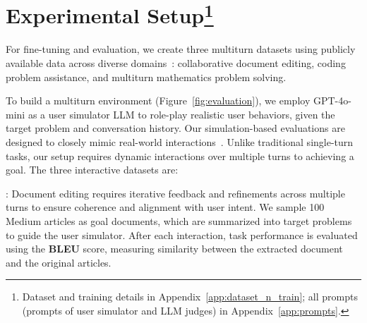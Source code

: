 \section{Experimental Setup\protect\footnote{Dataset and training details in Appendix~\ref{app:dataset_n_train}; all prompts (\eg prompts of user simulator and LLM judges) in Appendix~\ref{app:prompts}.}}

\begin{comment}
We conducted extensive and large-scale experiments to answer the following research questions:
\begin{itemize}
    \item How \textit{effective} are the \objects in collaborating with users? (Sec.~\ref{sec:quantitative})
    \item How do \objects outperform? What component is \textit{essential} to their success? 
    (Sec.~\ref{sec:ablation})
    \item What are the \textit{insights} from the generation results from interactive-trained LLMs? (Sec.~\ref{sec:case})
    \item Can the capabilities of interactive-trained LLMs \textit{generalize} to untrained data domains? (Sec.~\ref{sec:extended})
\end{itemize}
\end{comment}




For fine-tuning and evaluation, we create three multiturn datasets using publicly available data across diverse domains~\citep{math, bigcodebench, medium}: collaborative document editing, coding problem assistance, and multiturn mathematics problem solving.

To build a multiturn environment (Figure~\ref{fig:evaluation}), we employ GPT-4o-mini as a user simulator LLM to role-play realistic user behaviors, given the target problem and conversation history. Our simulation-based evaluations are designed to closely mimic real-world interactions~\cite{simulate1000}. 
Unlike traditional single-turn tasks, our setup requires dynamic interactions over multiple turns to achieving a goal. 
The three interactive datasets are: 

\noindent \textbf{\doct}: Document editing requires iterative feedback and refinements across multiple turns to ensure coherence and alignment with user intent. We sample 100 Medium articles as goal documents, which are summarized into target problems to guide the user simulator. After each interaction, task performance is evaluated using the \textbf{BLEU} score, measuring similarity between the extracted document and the original articles.

